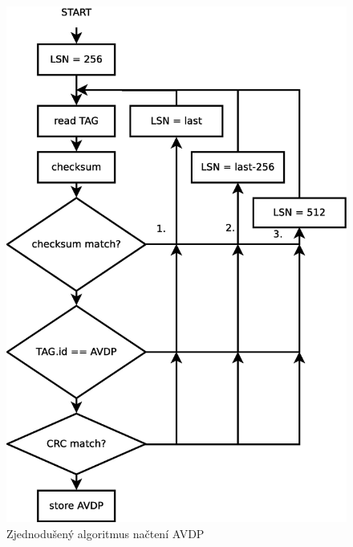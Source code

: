 \begin{figure}[ht] 
    \centering
    \includegraphics[scale=0.4]{obrazky/avdp.eps}
    \caption{Zjednodušený algoritmus načtení AVDP}
    \label{fig:avdp}
\end{figure}

